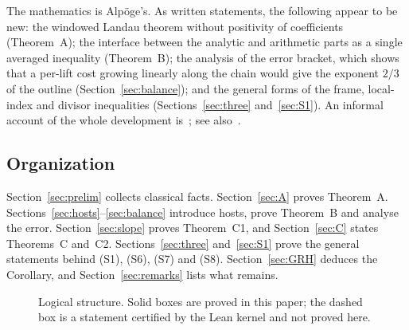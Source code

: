 \documentclass[11pt]{amsart}
\newcommand{\eps}{\varepsilon}
\newcommand{\re}{\operatorname{Re}}
\newcommand{\ASK}{\mathrm{ASK}}
\newcommand{\MAIN}{\mathrm{MAIN}}
\theoremstyle{plain}
\theoremstyle{definition}
\numberwithin{equation}{section}
\begin{document}
The mathematics is Alp\"oge's. As written statements, the following appear to be new: the
windowed Landau theorem without positivity of coefficients (Theorem~A); the interface between the
analytic and arithmetic parts as a single averaged inequality (Theorem~B); the analysis of the
error bracket, which shows that a per-lift cost growing linearly along the chain would give the
exponent $2/3$ of the outline (Section~\ref{sec:balance}); and the general forms of the frame,
local-index and divisor inequalities (Sections~\ref{sec:three} and~\ref{sec:S1}). An informal
account of the whole development is~\cite{dixit-account}; see also~\cite{naskrecki,jaswal}.

\subsection{Organization}

Section~\ref{sec:prelim} collects classical facts. Section~\ref{sec:A} proves Theorem~A.
Sections~\ref{sec:hosts}--\ref{sec:balance} introduce hosts, prove Theorem~B and analyse the error.
Section~\ref{sec:slope} proves Theorem~C1, and Section~\ref{sec:C} states Theorems~C and~C2.
Sections~\ref{sec:three} and~\ref{sec:S1} prove the general statements behind (S1), (S6), (S7) and
(S8). Section~\ref{sec:GRH} deduces the Corollary, and Section~\ref{sec:remarks} lists what remains.

\begin{figure}[ht]
\centering
{}
\caption{Logical structure. Solid boxes are proved in this paper; the dashed box is a statement
certified by the Lean kernel and not proved here.}\label{fig:structure}
\end{figure}
\end{document}
